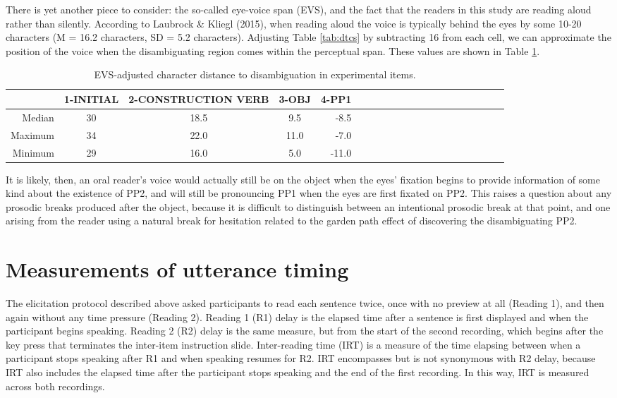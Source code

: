 \documentclass[12pt,oneside]{book}
\begin{document}
There is yet another piece to consider: the so-called eye-voice span (EVS), and the fact that the readers in this study are reading aloud rather than silently. According to Laubrock \& Kliegl (2015), when reading aloud the voice is typically behind the eyes by some 10-20 characters (M = 16.2 characters, SD = 5.2 characters). Adjusting Table \ref{tab:dtcs} by subtracting 16 from each cell, we can approximate the position of the voice when the disambiguating region comes within the perceptual span. These values are shown in Table \ref{tab:evsdtcr}.

\begin{table}[!h]

\caption{\label{tab:evsdtcr}EVS-adjusted character distance to disambiguation in experimental items.}
\centering
\begin{tabular}{rcccrcccrcccrcccrccc}
\toprule
  & 1-INITIAL & 2-CONSTRUCTION VERB & 3-OBJ & 4-PP1\\
\midrule
Median & 30 & 18.5 & 9.5 & -8.5\\
Maximum & 34 & 22.0 & 11.0 & -7.0\\
Minimum & 29 & 16.0 & 5.0 & -11.0\\
\bottomrule
\end{tabular}
\end{table}

It is likely, then, an oral reader's voice would actually still be on the object when the eyes' fixation begins to provide information of some kind about the existence of PP2, and will still be pronouncing PP1 when the eyes are first fixated on PP2. This raises a question about any prosodic breaks produced after the object, because it is difficult to distinguish between an intentional prosodic break at that point, and one arising from the reader using a natural break for hesitation related to the garden path effect of discovering the disambiguating PP2.

\hypertarget{method-irt}{%
\section{Measurements of utterance timing}\label{method-irt}}

The elicitation protocol described above asked participants to read each sentence twice, once with no preview at all (Reading 1), and then again without any time pressure (Reading 2). Reading 1 (R1) delay is the elapsed time after a sentence is first displayed and when the participant begins speaking. Reading 2 (R2) delay is the same measure, but from the start of the second recording, which begins after the key press that terminates the inter-item instruction slide. Inter-reading time (IRT) is a measure of the time elapsing between when a participant stops speaking after R1 and when speaking resumes for R2. IRT encompasses but is not synonymous with R2 delay, because IRT also includes the elapsed time after the participant stops speaking and the end of the first recording. In this way, IRT is measured across both recordings.
\end{document}
